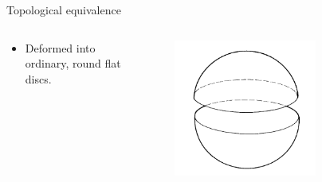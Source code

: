 \documentclass{beamer}
\begin{document}
\begin{frame}{Topological equivalence}
  \begin{columns}
    \begin{column}{0.6\textwidth}
      \begin{block}{}
        \begin{itemize}
        \item Deformed into ordinary, round flat discs.
        \end{itemize}
      \end{block}
    \end{column}
    \begin{column}{0.4\textwidth}
      \begin{figure}
        \centering
        \includegraphics[width=0.7\textwidth]{figure_1_7.png}
        \caption{}
      \end{figure}
    \end{column}
  \end{columns}
\end{frame}
\end{document}
